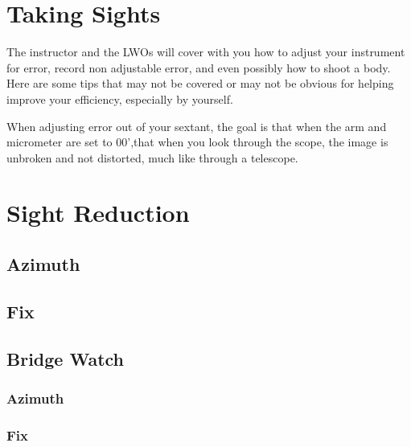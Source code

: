 \documentclass[letterpaper,12pt]{article}
\begin{document}
\section{Taking Sights}
The instructor and the LWOs will cover with you how to adjust your instrument for error, record non adjustable error, and even possibly how to shoot a body.
Here are some tips that may not be covered or may not be obvious for helping improve your efficiency, especially by yourself.

When adjusting error out of your sextant, the goal is that when the arm and micrometer are set to 00',that when you look through the scope, the image is unbroken and not distorted, much like through a telescope. 
\section{Sight Reduction}
\subsection{Azimuth}
\subsection{Fix}
\subsection{Bridge Watch}
\subsubsection{Azimuth} \label{doubleget}
\subsubsection{Fix}
\printbibliography
\end{document}
